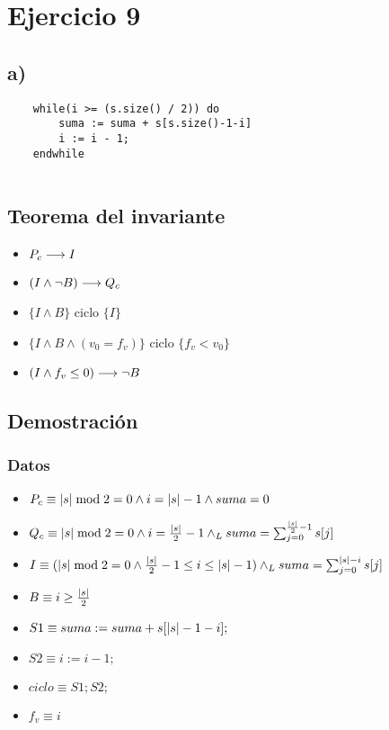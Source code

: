 \documentclass{article}
\begin{document}
\section*{Ejercicio 9}

\subsection*{a)}

\begin{verbatim}
    while(i >= (s.size() / 2)) do
        suma := suma + s[s.size()-1-i]
        i := i - 1;
    endwhile
    
\end{verbatim}
\subsection*{Teorema del invariante}
\begin{itemize}
    \item $P_{c} \longrightarrow I$
    \item $(I \wedge \neg B) \longrightarrow Q_{c}$
    \item $\{I \wedge B\}$ ciclo $\{ I \}$
    \item $\{I \wedge B \wedge (v_{0} = f_{v})\}$ ciclo $\{f_{v} < v_{0}\}$
    \item $(I \wedge f_{v} \leq 0) \longrightarrow \neg B$
\end{itemize}

\subsection*{Demostración}
\subsubsection*{Datos}
\begin{itemize}
    \item $P_{c}    \equiv |s| \bmod 2 = 0 \wedge i = |s| - 1 \wedge suma = 0 $
    \item $Q_{c}    \equiv |s| \bmod 2 = 0 \wedge i = \frac{|s|}{2} - 1 \land _L suma = \sum_{j=0}^{\frac{|s|}{2}-1} s[j] $
    \item $I        \equiv (|s| \bmod 2 = 0 \wedge \frac{|s|}{2} - 1 \leq i \leq |s| - 1) \land _L suma = \sum_{j=0}^{|s|-i} s[j] $
    \item $B        \equiv i \geq \frac{|s|}{2}$
    \item $S1       \equiv suma := suma + s[|s|-1-i];$
    \item $S2       \equiv i:= i - 1;$
    \item $ciclo    \equiv S1;S2;$
    \item $f_{v}    \equiv i$
\end{itemize}
\end{document}
